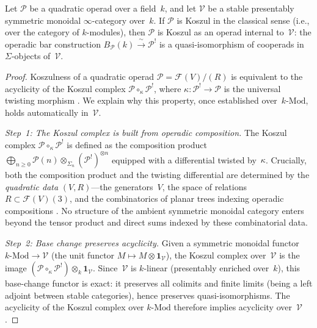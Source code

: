 \begin{lemma}
\label{lem:operadic-koszul-transfer}
Let\/ $\mathcal{P}$ be a quadratic operad over a field\/~$k$, and let\/
$\mathcal{V}$ be a stable presentably symmetric monoidal\/
$\infty$-category over\/~$k$.  If\/ $\mathcal{P}$ is Koszul in the
classical sense \textup{(}i.e., over the category of\/ $k$-modules\textup{)},
then\/ $\mathcal{P}$ is Koszul as an operad internal to\/~$\mathcal{V}$:
the operadic bar construction\/
$B_{\mathcal{P}}(k) \xrightarrow{\;\sim\;} \mathcal{P}^!$
is a quasi-isomorphism of cooperads in\/ $\Sigma$-objects of\/~$\mathcal{V}$.
\end{lemma}

\begin{proof}
Koszulness of a quadratic operad $\mathcal{P} = \mathcal{F}(V)/(R)$
is equivalent to the acyclicity of the Koszul complex
$\mathcal{P} \circ_\kappa \mathcal{P}^!$, where $\kappa \colon
\mathcal{P}^! \to \mathcal{P}$ is the universal twisting morphism
\cite[Theorem~7.4.2]{LV12}.  We explain why this property, once
established over~$k$\nobreakdash-$\mathrm{Mod}$, holds automatically
in~$\mathcal{V}$.

\emph{Step~1: The Koszul complex is built from operadic composition.}
The Koszul complex $\mathcal{P} \circ_\kappa \mathcal{P}^!$ is
defined as the composition product
$\bigoplus_{n \geq 0} \mathcal{P}(n) \otimes_{\Sigma_n}
(\mathcal{P}^!)^{\otimes n}$ equipped with a differential twisted
by~$\kappa$.  Crucially, both the composition product and the
twisting differential are determined by the \emph{quadratic data}
$(V, R)$---the generators~$V$, the space of
relations~$R \subset \mathcal{F}(V)(3)$, and the combinatorics
of planar trees indexing operadic compositions
\cite[§7.4]{LV12}.  No structure of the ambient symmetric monoidal
category enters beyond the tensor product and direct sums indexed
by these combinatorial data.

\emph{Step~2: Base change preserves acyclicity.}
Given a symmetric monoidal functor $k\text{-}\mathrm{Mod} \to
\mathcal{V}$ (the unit functor $M \mapsto M \otimes \mathbf{1}_{\mathcal{V}}$),
the Koszul complex over~$\mathcal{V}$ is the image
$(\mathcal{P} \circ_\kappa \mathcal{P}^!) \otimes_k \mathbf{1}_{\mathcal{V}}$.
Since~$\mathcal{V}$ is $k$-linear (presentably enriched over~$k$),
this base-change functor is exact: it preserves all colimits and
finite limits (being a left adjoint between stable categories),
hence preserves quasi-isomorphisms.  The acyclicity of the
Koszul complex over $k$\nobreakdash-$\mathrm{Mod}$
\cite[Theorem~7.4.1]{LV12} therefore implies acyclicity
over~$\mathcal{V}$.


\end{proof}
